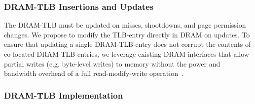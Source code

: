 
\subsubsection{DRAM-TLB Insertions and Updates}

\noindent The DRAM-TLB must be updated on misses, shootdowns, and page
permission changes. We propose to modify the TLB-entry directly in
DRAM on updates. To ensure that updating a single DRAM-TLB-entry does
not corrupt the contents of co-located DRAM-TLB entries, we leverage
existing DRAM interfaces that allow partial writes (e.g. byte-level
writes) to memory without the power and bandwidth overhead of a full
read-modify-write operation~\cite{hbm-spec}.






% 

\subsubsection{DRAM-TLB Implementation}


